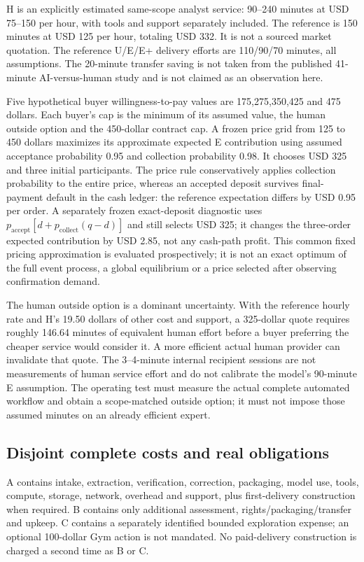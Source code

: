 H is an explicitly estimated same-scope analyst service: 90--240 minutes at USD 75--150 per hour, with tools and support separately included. The reference is 150 minutes at USD 125 per hour, totaling USD 332. It is not a sourced market quotation. The reference U/E/E+ delivery efforts are 110/90/70 minutes, all assumptions. The 20-minute transfer saving is not taken from the published 41-minute AI-versus-human study and is not claimed as an observation here.

Five hypothetical buyer willingness-to-pay values are 175,275,350,425 and 475 dollars. Each buyer's cap is the minimum of its assumed value, the human outside option and the 450-dollar contract cap. A frozen price grid from 125 to 450 dollars maximizes its approximate expected E contribution using assumed acceptance probability 0.95 and collection probability 0.98. It chooses USD 325 and three initial participants. The price rule conservatively applies collection probability to the entire price, whereas an accepted deposit survives final-payment default in the cash ledger: the reference expectation differs by USD 0.95 per order. A separately frozen exact-deposit diagnostic uses $p_{\mathrm{accept}}[d+p_{\mathrm{collect}}(q-d)]$ and still selects USD 325; it changes the three-order expected contribution by USD 2.85, not any cash-path profit. This common fixed pricing approximation is evaluated prospectively; it is not an exact optimum of the full event process, a global equilibrium or a price selected after observing confirmation demand.

The human outside option is a dominant uncertainty. With the reference hourly rate and H's 19.50 dollars of other cost and support, a 325-dollar quote requires roughly 146.64 minutes of equivalent human effort before a buyer preferring the cheaper service would consider it. A more efficient actual human provider can invalidate that quote. The 3--4-minute internal recipient sessions are not measurements of human service effort and do not calibrate the model's 90-minute E assumption. The operating test must measure the actual complete automated workflow and obtain a scope-matched outside option; it must not impose those assumed minutes on an already efficient expert.

\subsection{Disjoint complete costs and real obligations}

A contains intake, extraction, verification, correction, packaging, model use, tools, compute, storage, network, overhead and support, plus first-delivery construction when required. B contains only additional assessment, rights/packaging/transfer and upkeep. C contains a separately identified bounded exploration expense; an optional 100-dollar Gym action is not mandated. No paid-delivery construction is charged a second time as B or C.

